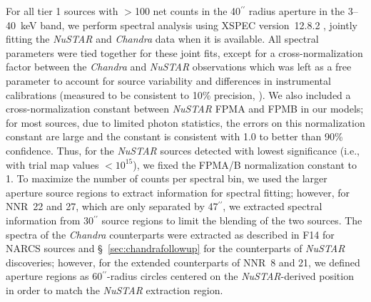 \documentclass[iop,revtex4]{emulateapj}
\begin{document}
For all tier 1 sources with $>$100 net counts in the 40$^{\prime\prime}$ radius aperture in the 3--40~keV band, we perform spectral analysis using XSPEC version~12.8.2 \citep{arnaud96}, jointly fitting the \textit{NuSTAR} and \textit{Chandra} data when it is available.  All spectral parameters were tied together for these joint fits, except for a cross-normalization factor between the \textit{Chandra} and \textit{NuSTAR} observations which was left as a free parameter to account for source variability and differences in instrumental calibrations (measured to be consistent to 10\% precision, \citealt{madsen15}).  We also included a cross-normalization constant between \textit{NuSTAR} FPMA and FPMB in our models; for most sources, due to limited photon statistics, the errors on this normalization constant are large and the constant is consistent with 1.0 to better than 90\% confidence.  Thus, for the \textit{NuSTAR} sources detected with lowest significance (i.e., with trial map values $<10^{15}$), we fixed the FPMA/B normalization constant to 1. To maximize the number of counts per spectral bin, we used the larger aperture source regions to extract information for spectral fitting; however, for NNR~22 and 27, which are only separated by 47$^{\prime\prime}$, we extracted spectral information from 30$^{\prime\prime}$ source regions to limit the blending of the two sources.  The spectra of the \textit{Chandra} counterparts were extracted as described in F14 for NARCS sources and \S~\ref{sec:chandrafollowup} for the counterparts of \textit{NuSTAR} discoveries; however, for the extended counterparts of NNR~8 and 21, we defined aperture regions as 60$^{\prime\prime}$-radius circles centered on the \textit{NuSTAR}-derived position in order to match the \textit{NuSTAR} extraction region.  \par
\end{document}
